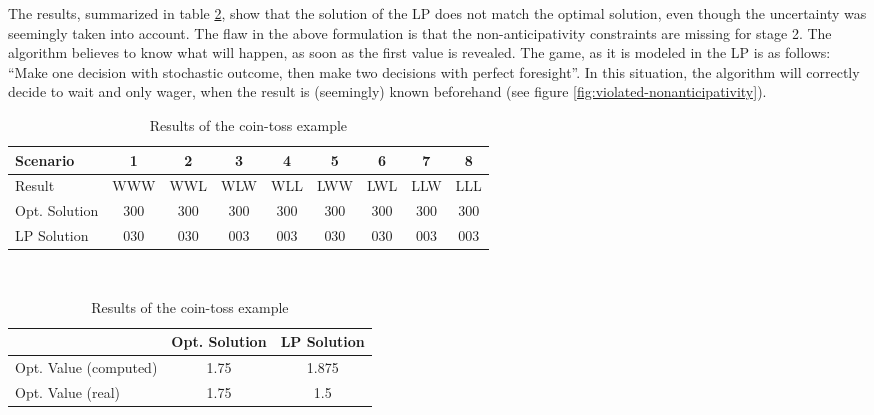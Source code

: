 \begin{example}
  The results, summarized in table \ref{tab:coin-toss-results}, show that the solution of the LP does not match the optimal solution, even though the uncertainty was seemingly taken into account.
  The flaw in the above formulation is that the non-anticipativity constraints are missing for stage 2.
  The algorithm believes to know what will happen, as soon as the first value is revealed.
  The game, as it is modeled in the LP is as follows:
  ``Make one decision with stochastic outcome, then make two decisions with perfect foresight''.
  In this situation, the algorithm will correctly decide to wait and only wager, when the result is (seemingly) known beforehand (see figure \ref{fig:violated-nonanticipativity}).
  
  \begin{table}
    \small\centering
    \begin{tabular}{lcccccccc}
      \hline
      Scenario&1&2&3&4&5&6&7&8\\\hline\hline
      Result&WWW&WWL&WLW&WLL&LWW&LWL&LLW&LLL\\
      Opt. Solution&300&300&300&300&300&300&300&300\\
      LP Solution&030&030&003&003&030&030&003&003\\\hline
    \end{tabular}
    \vspace*{0.5cm}\\
    \begin{tabular}{lcc}
      \hline
      &Opt. Solution&LP Solution\\\hline\hline
      Opt. Value (computed)&1.75&1.875\\
      Opt. Value (real)&1.75&1.5\\
      \hline
    \end{tabular}
    \caption{Results of the coin-toss example}
    \label{tab:coin-toss-results}
  \end{table}
\end{example}

